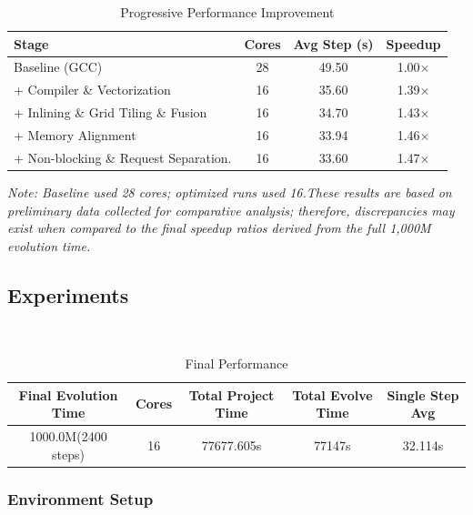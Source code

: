\begin{table}[!htbp]
    \centering
    \caption{Progressive Performance Improvement}
    \label{tab:opt_progress}
    \small 
    \begin{tabular}{|l|c|c|c|}
        \hline
        \textbf{Stage} & \textbf{Cores} & \textbf{Avg Step (s)} & \textbf{Speedup} \\ 
        \hline
        Baseline (GCC) & 28 & 49.50 & 1.00$\times$ \\ 
        \hline
        + Compiler \& Vectorization & 16 & 35.60 & 1.39$\times$ \\ 
        \hline
        + Inlining \& Grid Tiling \& Fusion & 16 & 34.70 & 1.43$\times$ \\ 
        \hline
        + Memory Alignment & 16 & 33.94 & 1.46$\times$ \\ 
        \hline
        + Non-blocking \& Request Separation. & 16 & 33.60 & 1.47$\times$ \\ 
        \hline
        
    \end{tabular}
    \parbox{\linewidth}{\footnotesize \textit{Note: Baseline used 28 cores; optimized runs used 16.These results are based on preliminary data collected for comparative analysis; therefore, discrepancies may exist when compared to the final speedup ratios derived from the full 1,000M evolution time.}}
\end{table}
\subsection{Experiments}
\ 
\begin{table}[h]
    \centering
    \caption{Final Performance }
  
    \small %
    \begin{tabular}{|c|c|c|c|c|}
        \hline
        \textbf{Final Evolution Time }& \textbf{Cores} & \textbf{Total Project Time} &\textbf{Total Evolve Time} & \textbf{Single Step Avg} \\ \hline
        1000.0M(2400 steps) & 16 & 77677.605s& 77147s& 32.114s \\ \hline
    \end{tabular}
\end{table}

\subsubsection{Environment Setup}
\ 

